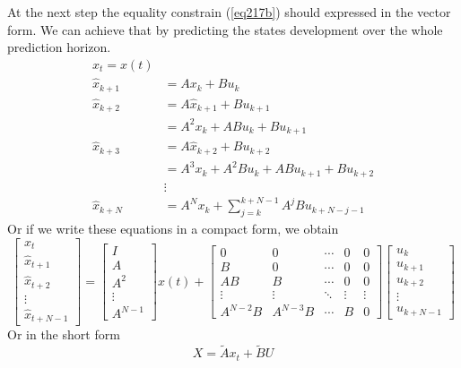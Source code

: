 At the next step the equality constrain (\ref{eq217b}) should expressed in the vector form. We can achieve that by predicting the states development over the whole prediction horizon.
\begin{equation}
\begin{split}
x_t = x(t)\\
\hat{x}_{k+1} &= Ax_k + Bu_k\\
\hat{x}_{k+2} &= A\hat{x}_{k+1} + Bu_{k+1}\\
&= A^2x_k + ABu_k + Bu_{k+1}\\
\hat{x}_{k+3} &= A\hat{x}_{k+2} + Bu_{k+2}\\
&= A^3x_k + A^2Bu_k + ABu_{k+1} + Bu_{k+2}\\
&\vdots\\
\hat{x}_{k+N} &= A^Nx_k+\sum_{j=k}^{k+N-1}A^jBu_{k+N-j-1}
\end{split}
\end{equation}
Or if we write these equations in a compact form, we obtain
\begin{equation}
	\begin{bmatrix}
	x_t\\\hat{x}_{t+1}\\ \hat{x}_{t+2}\\\vdots\\ \hat{x}_{t+N-1}
	\end{bmatrix} = 
	\begin{bmatrix}I\\A\\A^2\\ \vdots \\ A^{N-1}\end{bmatrix}x(t) + 
	\begin{bmatrix}
	0& 0&\cdots&0&0\\
	B&0&\cdots&0&0\\
	AB&B&\cdots&0&0\\
	\vdots&\vdots&\ddots&\vdots&\vdots\\
	A^{N-2}B&A^{N-3}B&\cdots&B&0\end{bmatrix}
	\begin{bmatrix}u_k\\u_{k+1}\\u_{k+2}\\\vdots\\u_{k+N-1}\end{bmatrix}
\end{equation}
Or in the short form
\begin{equation}\label{eq227}
	X = \tilde{A}x_t + \tilde{B}U
\end{equation}
